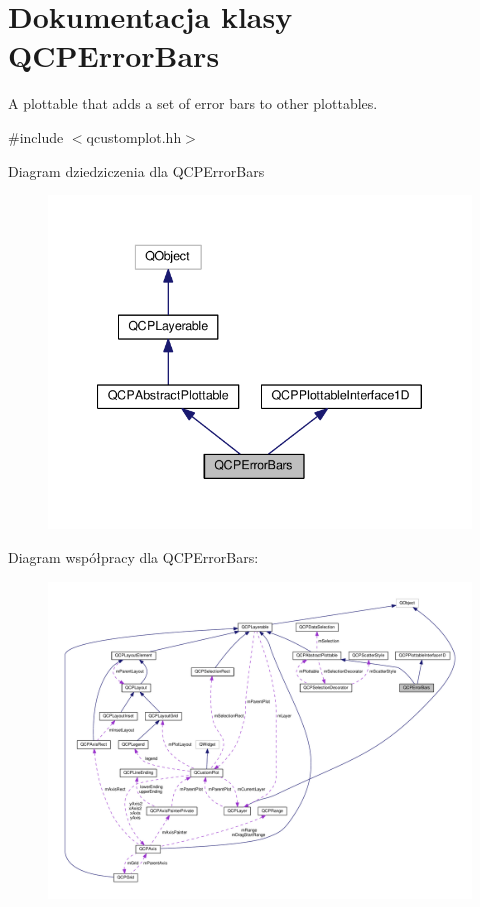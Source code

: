 \hypertarget{class_q_c_p_error_bars}{}\section{Dokumentacja klasy Q\+C\+P\+Error\+Bars}
\label{class_q_c_p_error_bars}


A plottable that adds a set of error bars to other plottables.  




{\ttfamily \#include $<$qcustomplot.\+hh$>$}



Diagram dziedziczenia dla Q\+C\+P\+Error\+Bars\nopagebreak
\begin{figure}[H]
\begin{center}
\leavevmode
\includegraphics[width=340pt]{class_q_c_p_error_bars__inherit__graph}
\end{center}
\end{figure}


Diagram współpracy dla Q\+C\+P\+Error\+Bars\+:\nopagebreak
\begin{figure}[H]
\begin{center}
\leavevmode
\includegraphics[width=350pt]{class_q_c_p_error_bars__coll__graph}
\end{center}
\end{figure}

